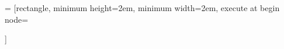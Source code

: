 \usepackage[left=3mm,right=3mm,top=3mm,bottom=3mm]{geometry}
\usepackage{graphicx} %
\usepackage[table]{xcolor}
\usepackage{natbib}
\usepackage{rotating}
\usepackage{xurl}
\usepackage{doi}
\usepackage{fancyhdr}
\usepackage{caption,subcaption}
\usepackage[object=vectorian]{pgfornament} %
\usepackage{lipsum,tikz}
\usepackage{hyperref}
\usepackage[T1]{fontenc}
\usepackage[many]{tcolorbox}
\usepackage{varwidth}
\setlength{\parskip}{1em}
\setlength{\parindent}{0em}
\usepackage{marvosym}

\newcommand{\tbd}{\textcolor{red}{pending}}
\usepackage{graphicx}
\usepackage{textcomp}
\usetikzlibrary{positioning,calc}

 = [rectangle, minimum height=2em, minimum width=2em, execute at begin node={\begin{varwidth}{40mm}},execute at end node={\end{varwidth}}]

